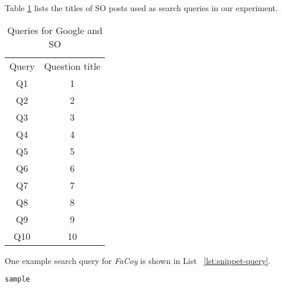 Table \ref{tab:so-questions} lists the titles of SO posts used as search queries in our experiment.

\begin{table}
	\begin{center}
		\begin{tabular}{ c|c } 
			Query & Question title \\ 
			Q1 &  1\\\hline 
			Q2 &  2 \\ \hline
			Q3 &  3 \\ \hline
			Q4 &  4 \\ \hline
			Q5 &  5 \\ \hline
			Q6 &  6 \\ \hline
			Q7 &  7	\\ \hline
			Q8 &  8	\\ \hline
			Q9 &  9	\\ \hline
			Q10 & 10\\ \hline
		\end{tabular}		
	\end{center}
	\caption{Queries for Google and SO}
	\label{tab:so-questions}
\end{table}

One example search query for \textit{FaCoy} is shown in List ~\ref{lst:snippet-query}.
\begin{lstlisting}[label={lst:snippet-query}]
	sample
\end{lstlisting}
